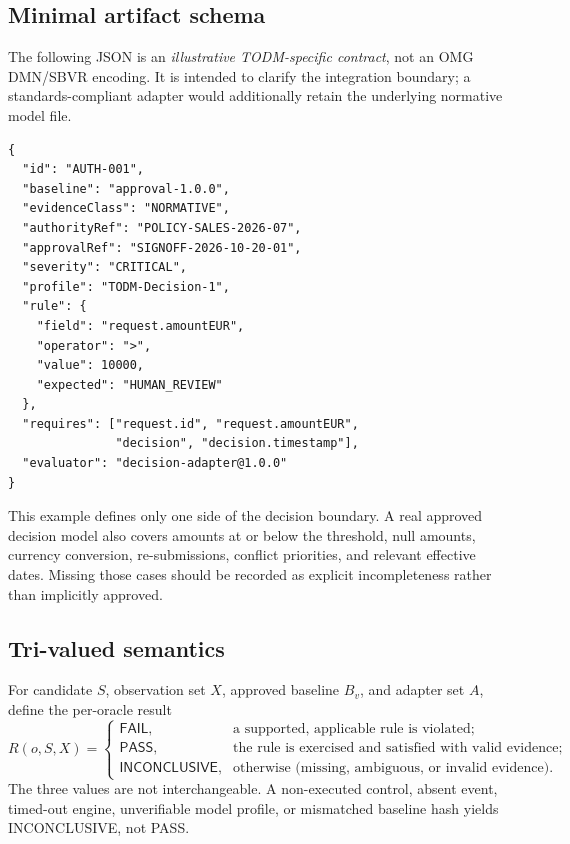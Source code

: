 \documentclass[11pt,a4paper]{article}
\newcommand{\PASS}{\textsf{PASS}}
\newcommand{\FAIL}{\textsf{FAIL}}
\newcommand{\INC}{\textsf{INCONCLUSIVE}}
\begin{document}
\subsection{Minimal artifact schema}
The following JSON is an \emph{illustrative TODM-specific contract}, not an OMG DMN/SBVR encoding. It is intended to clarify the integration boundary; a standards-compliant adapter would additionally retain the underlying normative model file.
\begin{lstlisting}[language={},caption={Illustrative vendor-neutral oracle manifest; not a standardized OMG schema.},label={lst:oracle}]
{
  "id": "AUTH-001",
  "baseline": "approval-1.0.0",
  "evidenceClass": "NORMATIVE",
  "authorityRef": "POLICY-SALES-2026-07",
  "approvalRef": "SIGNOFF-2026-10-20-01",
  "severity": "CRITICAL",
  "profile": "TODM-Decision-1",
  "rule": {
    "field": "request.amountEUR",
    "operator": ">",
    "value": 10000,
    "expected": "HUMAN_REVIEW"
  },
  "requires": ["request.id", "request.amountEUR",
               "decision", "decision.timestamp"],
  "evaluator": "decision-adapter@1.0.0"
}
\end{lstlisting}
This example defines only one side of the decision boundary. A real approved decision model also covers amounts at or below the threshold, null amounts, currency conversion, re-submissions, conflict priorities, and relevant effective dates. Missing those cases should be recorded as explicit incompleteness rather than implicitly approved.

\subsection{Tri-valued semantics}
For candidate $S$, observation set $X$, approved baseline $B_v$, and adapter set $A$, define the per-oracle result
\begin{equation}
R(o,S,X)=\begin{cases}
\FAIL{}, & \text{a supported, applicable rule is violated};\\
\PASS{}, & \text{the rule is exercised and satisfied with valid evidence};\\
\INC{}, & \text{otherwise (missing, ambiguous, or invalid evidence).}
\end{cases}
\label{eq:tristate}
\end{equation}
The three values are not interchangeable. A non-executed control, absent event, timed-out engine, unverifiable model profile, or mismatched baseline hash yields \INC{}, not \PASS{}.
\end{document}
